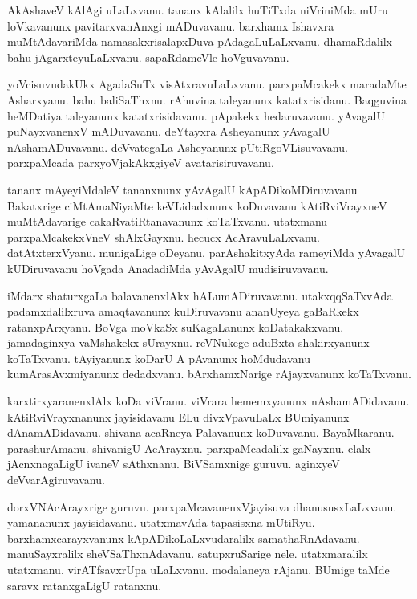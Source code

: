 \documentclass{article}
\begin{document}
\begin{mn}%
AkAshaveV kAlAgi uLaLxvanu. tananx kAlalilx huTiTxda niVriniMda mUru loVkavanunx pavitarxvanAnxgi 
mADuvavanu. barxhamx Ishavxra muMtAdavariMda namasakxrisalapxDuva pAdagaLuLaLxvanu. dhamaRdalilx 
bahu jAgarxteyuLaLxvanu. sapaRdameVle hoVguvavanu.
\end{mn}

\begin{mn}%
yoVcisuvudakUkx AgadaSuTx visAtxravuLaLxvanu. parxpaMcakekx maradaMte Asharxyanu. bahu baliSaThxnu. 
rAhuvina taleyanunx katatxrisidanu. Baqguvina heMDatiya taleyanunx katatxrisidavanu. pApakekx 
hedaruvavanu. yAvagalU puNayxvanenxV mADuvavanu. deYtayxra Asheyanunx yAvagalU nAshamADuvavanu. 
deVvategaLa Asheyanunx pUtiRgoVLisuvavanu. parxpaMcada parxyoVjakAkxgiyeV avatarisiruvavanu.
\end{mn}

\begin{mn}%
tananx mAyeyiMdaleV tananxnunx yAvAgalU kApADikoMDiruvavanu Bakatxrige ciMtAmaNiyaMte keVLidadxnunx 
koDuvavanu kAtiRviVrayxneV muMtAdavarige cakaRvatiRtanavanunx koTaTxvanu. utatxmanu 
parxpaMcakekxVneV shAlxGayxnu. hecucx AcAravuLaLxvanu. datAtxterxVyanu. munigaLige oDeyanu. 
parAshakitxyAda rameyiMda yAvagalU kUDiruvavanu hoVgada AnadadiMda yAvAgalU mudisiruvavanu.
\end{mn}

\begin{mn}%
iMdarx shaturxgaLa balavanenxlAkx hALumADiruvavanu. utakxqqSaTxvAda padamxdalilxruva amaqtavanunx 
kuDiruvavanu ananUyeya gaBaRkekx ratanxpArxyanu. BoVga moVkaSx suKagaLanunx koDatakakxvanu. 
jamadaginxya vaMshakekx sUrayxnu. reVNukege aduBxta shakirxyanunx koTaTxvanu. tAyiyanunx koDarU A 
pAvanunx hoMdudavanu kumArasAvxmiyanunx dedadxvanu. bArxhamxNarige rAjayxvanunx koTaTxvanu.
\end{mn}

\begin{mn}%
karxtirxyaranenxlAlx koDa viVranu. viVrara hememxyanunx nAshamADidavanu. kAtiRviVrayxnanunx 
jayisidavanu ELu divxVpavuLaLx BUmiyanunx dAnamADidavanu. shivana acaRneya Palavanunx koDuvavanu. 
BayaMkaranu. parashurAmanu. shivanigU AcArayxnu. parxpaMcadalilx gaNayxnu. elalx jAcnxnagaLigU 
ivaneV sAthxnanu. BiVSamxnige guruvu. aginxyeV deVvarAgiruvavanu.
\end{mn}

\begin{mn}%
dorxVNAcArayxrige guruvu. parxpaMcavanenxVjayisuva dhanususxLaLxvanu. yamananunx jayisidavanu. 
utatxmavAda tapasisxna mUtiRyu. barxhamxcarayxvanunx kApADikoLaLxvudaralilx samathaRnAdavanu. 
manuSayxralilx sheVSaThxnAdavanu. satupxruSarige nele. utatxmaralilx utatxmanu. virATfsavxrUpa 
uLaLxvanu. modalaneya rAjanu. BUmige taMde saravx ratanxgaLigU ratanxnu.
\end{mn}
\end{document}
